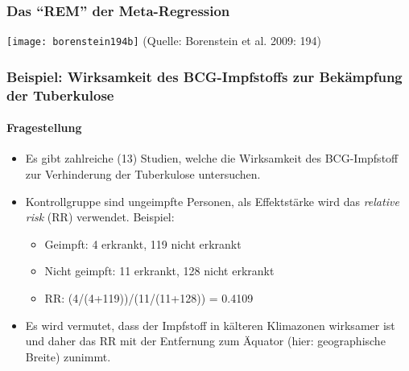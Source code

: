\begin{frame}[shrink = 5]
  \frametitle{Das "`REM"' der Meta-Regression}
  \texttt{[image: borenstein194b]}
\newline(Quelle: Borenstein et al. 2009: 194)
\end{frame}


\begin{frame}
  \frametitle{Beispiel: Wirksamkeit des BCG-Impfstoffs zur Bekämpfung der Tuberkulose}
  \framesubtitle{Fragestellung}

  \begin{itemize}
  \item Es gibt zahlreiche (13) Studien, welche die Wirksamkeit des
    BCG-Impfstoff zur Verhinderung der Tuberkulose untersuchen.
  \item Kontrollgruppe sind ungeimpfte Personen, als Effektstärke wird das
    \emph{relative risk} (RR) verwendet. Beispiel:
    \begin{itemize}
    \item Geimpft: 4 erkrankt, 119 nicht erkrankt
    \item Nicht geimpft: 11 erkrankt, 128 nicht erkrankt
    \item RR: (4/(4+119))/(11/(11+128)) = 0.4109
    \end{itemize}
  \item Es wird vermutet, dass der Impfstoff in kälteren Klimazonen wirksamer
    ist und daher das RR mit der Entfernung zum Äquator (hier: geographische
    Breite) zunimmt.
  \end{itemize}
\end{frame}





